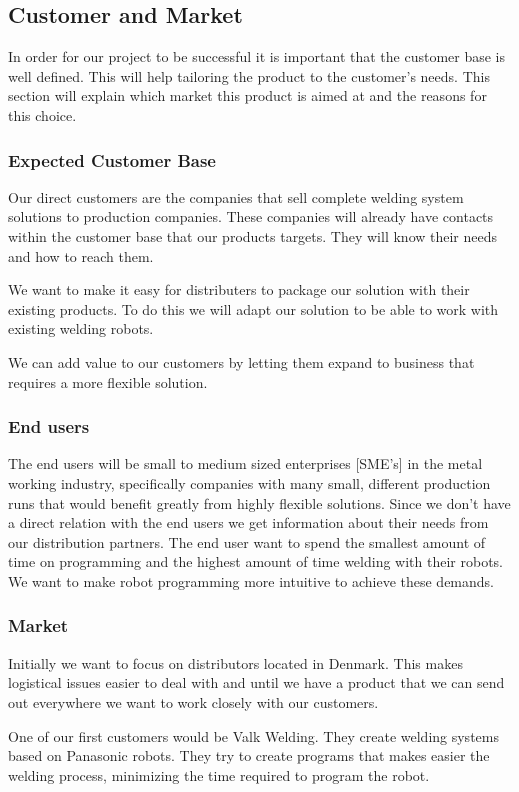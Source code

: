 \subsection{Customer and Market}
In order for our project to be successful it is important that the customer base is well defined. This will help tailoring the product to the customer's needs. This section will explain which market this product is aimed at and the reasons for this choice. 

\subsubsection{Expected Customer Base}
Our direct customers are the companies that sell complete welding system solutions to production companies. 
These companies will already have contacts within the customer base that our products targets.
They will know their needs and how to reach them. 

We want to make it easy for distributers to package our solution with their existing products.
To do this we will adapt our solution to be able to work with existing welding robots.

We can add value to our customers by letting them expand to business that requires a more flexible solution.

\subsubsection{End users}
The end users will be small to medium sized enterprises [SME's] in the metal working industry, specifically companies with many small, different production runs that would benefit greatly from highly flexible solutions.
Since we don't have a direct relation with the end users we get information about their needs from our distribution partners.
The end user want to spend the smallest amount of time on programming and the highest amount of time welding with their robots.
We want to make robot programming more intuitive to achieve these demands.

\subsubsection{Market}
Initially we want to focus on distributors located in Denmark.
This makes logistical issues easier to deal with and until we have a product that we can send out everywhere we want to work closely with our customers.

One of our first customers would be Valk Welding. They create welding systems based on Panasonic robots. They try to create programs that makes easier the welding process, minimizing the time required to program the robot.

